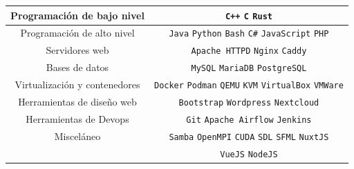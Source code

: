 \documentclass[9pt]{developercv} %
\begin{document}
\begin{tabular}{|c|c|}\hline

  Programación de bajo nivel &
  \texttt{C++}  \slashsep
  \texttt{C}    \slashsep
  \texttt{Rust} \\ \hline

  Programación de alto nivel &
  \texttt{Java}       \slashsep
  \texttt{Python}     \slashsep
  \texttt{Bash}       \slashsep
  \texttt{C\#}        \slashsep
  \texttt{JavaScript} \slashsep
  \texttt{PHP}        \\ \hline

  Servidores web &
  \texttt{Apache HTTPD} \slashsep
  \texttt{Nginx}        \slashsep
  \texttt{Caddy}        \\ \hline

  Bases de datos &
  \texttt{MySQL}      \slashsep
  \texttt{MariaDB}    \slashsep
  \texttt{PostgreSQL} \\ \hline

  Virtualización y contenedores &
  \texttt{Docker}     \slashsep
  \texttt{Podman}     \slashsep
  \texttt{QEMU}       \slashsep
  \texttt{KVM}        \slashsep
  \texttt{VirtualBox} \slashsep
  \texttt{VMWare}     \\ \hline

  Herramientas de diseño web &
  \texttt{Bootstrap}      \slashsep
  \texttt{Wordpress}      \slashsep
  \texttt{Nextcloud}      \\ \hline

  Herramientas de Devops  &
  \texttt{Git}            \slashsep
  \texttt{Apache Airflow} \slashsep
  \texttt{Jenkins}        \\ \hline

  Misceláneo &
  \texttt{Samba}   \slashsep
  \texttt{OpenMPI} \slashsep
  \texttt{CUDA}    \slashsep
  \texttt{SDL}     \slashsep
  \texttt{SFML}    \slashsep
  \texttt{NuxtJS}  \\ &
  \texttt{VueJS}   \slashsep
  \texttt{NodeJS}  \\ \hline

\end{tabular}
\end{document}
